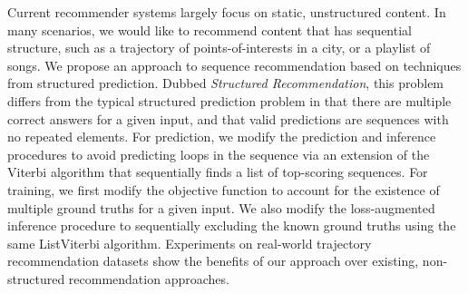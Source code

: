 
Current recommender systems largely focus on static, unstructured content.
In many scenarios, we would like to recommend content that has sequential structure,
such as %
a trajectory of points-of-interests in a city, or a playlist of songs.
We propose an approach to sequence recommendation based
on techniques from structured prediction.
Dubbed {\em Structured Recommendation}, 
this problem differs from the typical structured prediction problem 
in that there are multiple correct answers for a given input, 
and that valid predictions are sequences with no repeated elements. 
For prediction, we modify the prediction and inference procedures to avoid predicting loops in the sequence via an extension of the Viterbi algorithm that sequentially finds a list of top-scoring sequences. 
For training, we first modify the objective function to account for the existence of multiple ground truths for a given input. We also modify the loss-augmented inference procedure to sequentially excluding the known ground truths using the same ListViterbi algorithm. 
Experiments on real-world trajectory recommendation datasets show the benefits of our approach over existing, non-structured recommendation approaches.
